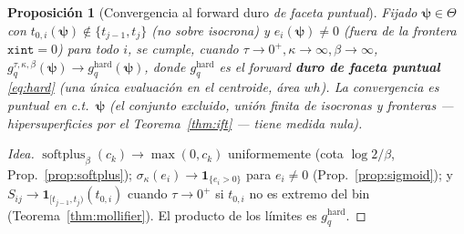 \documentclass[11pt,a4paper]{article}
\theoremstyle{plain}
\newtheorem{proposition}[theorem]{Proposici\'on}
\theoremstyle{definition}
\newcommand{\vect}[1]{\boldsymbol{#1}}
\newcommand{\softplus}{\operatorname{softplus}}
\begin{document}
\begin{proposition}[Convergencia al forward duro \emph{de faceta puntual}]\label{prop:consistencia}
Fijado $\vect{\psi}\in\Theta$ con $t_{0,i}(\vect{\psi})\notin\{t_{j-1},t_j\}$ (no
sobre isocrona) y $e_i(\vect{\psi})\neq0$ (fuera de la frontera $\texttt{xint}=0$)
para todo $i$, se cumple, cuando $\tau\to0^+,\kappa\to\infty,\beta\to\infty$,
$g^{\tau,\kappa,\beta}_q(\vect{\psi})\to g^{\mathrm{hard}}_q(\vect{\psi})$, donde
$g^{\mathrm{hard}}_q$ es el forward \textbf{duro de faceta puntual}
\eqref{eq:hard} (una \'unica evaluaci\'on en el centroide, \'area $w h$).
La convergencia es puntual en c.t.\ $\vect{\psi}$ (el conjunto excluido, uni\'on
finita de isocronas y fronteras --- hipersuperficies por el
Teorema~\ref{thm:ift} --- tiene medida nula).
\end{proposition}
\begin{proof}[Idea]
$\softplus_\beta(c_k)\to\max(0,c_k)$ uniformemente (cota $\log2/\beta$,
Prop.~\ref{prop:softplus}); $\sigma_\kappa(e_i)\to\mathbf 1_{\{e_i>0\}}$ para
$e_i\neq0$ (Prop.~\ref{prop:sigmoid}); y $S_{ij}\to\mathbf
1_{[t_{j-1},t_j)}(t_{0,i})$ cuando $\tau\to0^+$ si $t_{0,i}$ no es extremo del bin
(Teorema~\ref{thm:mollifier}). El producto de los l\'imites es
$g^{\mathrm{hard}}_q$.
\end{proof}
\end{document}
